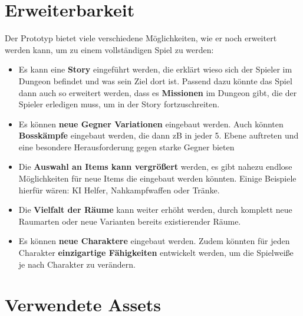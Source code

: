 \section{Erweiterbarkeit}
Der Prototyp bietet viele verschiedene Möglichkeiten, wie er noch erweitert werden kann, um zu einem vollständigen Spiel zu werden:
\begin{itemize}
\item Es kann eine \textbf{Story} eingeführt werden, die erklärt wieso sich der Spieler im Dungeon befindet und was sein Ziel dort ist. Passend dazu könnte das Spiel dann auch so erweitert werden, dass es \textbf{Missionen} im Dungeon gibt, die der Spieler erledigen muss, um in der Story fortzuschreiten.
\item Es können \textbf{neue Gegner Variationen} eingebaut werden. Auch könnten \textbf{Bosskämpfe} eingebaut werden, die dann zB in jeder 5. Ebene auftreten und eine besondere Herausforderung gegen starke Gegner bieten
\item Die \textbf{Auswahl an Items kann vergrößert} werden, es gibt nahezu endlose Möglichkeiten für neue Items die eingebaut werden könnten. Einige Beispiele hierfür wären: KI Helfer, Nahkampfwaffen oder Tränke.
\item Die \textbf{Vielfalt der Räume} kann weiter erhöht werden, durch komplett neue Raumarten oder neue Varianten bereits existierender Räume.
\item Es können \textbf{neue Charaktere} eingebaut werden. Zudem könnten für jeden Charakter \textbf{einzigartige Fähigkeiten} entwickelt werden, um die Spielweiße je nach Charakter zu verändern.
\end{itemize}

\section{Verwendete Assets}



